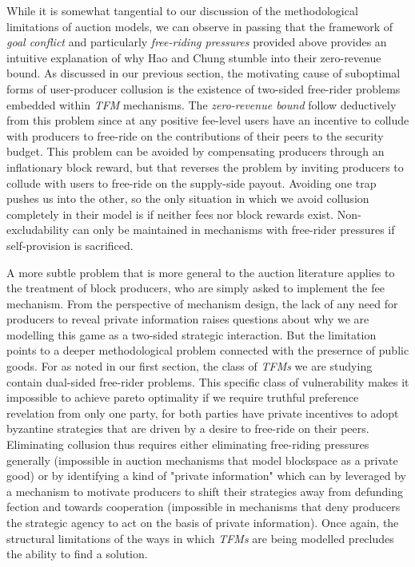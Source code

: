 While it is somewhat tangential to our discussion of the methodological limitations of auction models, we can observe in passing that the framework of \textit{goal conflict} and particularly \textit{free-riding pressures} provided above provides an intuitive explanation of why Hao and Chung stumble into their zero-revenue bound. As discussed in our previous section, the motivating cause of suboptimal forms of user-producer collusion is the existence of two-sided free-rider problems embedded within \textit{TFM} mechanisms. The \textit{zero-revenue bound} follow deductively from this problem since at any positive fee-level users have an incentive to collude with producers to free-ride on the contributions of their peers to the security budget. This problem can be avoided by compensating producers through an inflationary block reward, but that reverses the problem by inviting producers to collude with users to free-ride on the supply-side payout. Avoiding one trap pushes us into the other, so the only situation in which we avoid collusion completely in their model is if neither fees nor block rewards exist. Non-excludability can only be maintained in mechanisms with free-rider pressures if self-provision is sacrificed.

A more subtle problem that is more general to the auction literature applies to the treatment of block producers, who are simply asked to implement the fee mechanism. From the perspective of mechanism design, the lack of any need for producers to reveal private information raises questions about why we are modelling this game as a two-sided strategic interaction. But the limitation points to a deeper methodological problem connected with the presernce of public goods. For as noted in our first section, the class of \textit{TFMs} we are studying contain dual-sided free-rider problems. This specific class of vulnerability makes it impossible to achieve pareto optimality if we require truthful preference revelation from only one party, for both parties have private incentives to adopt byzantine strategies that are driven by a desire to free-ride on their peers. Eliminating collusion thus requires either eliminating free-riding pressures generally (impossible in auction mechanisms that model blockspace as a private good) or by identifying a kind of "private information" which can by leveraged by a mechanism to motivate producers to shift their strategies away from defunding fection and towards cooperation (impossible in mechanisms that deny producers the strategic agency to act on the basis of private information). Once again, the structural limitations of the ways in which \textit{TFMs} are being modelled precludes the ability to find a solution.


